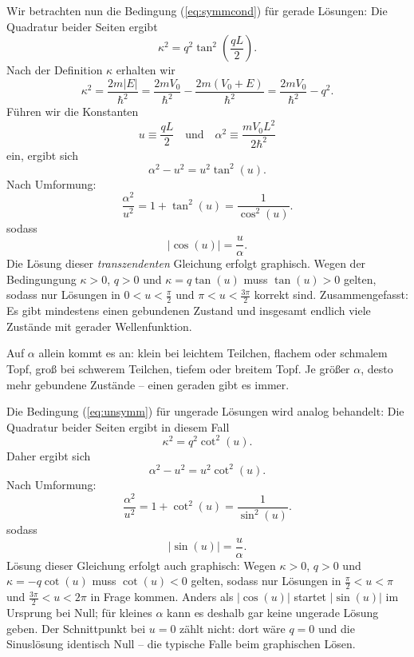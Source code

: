 Wir betrachten nun die Bedingung (\ref{eq:symmcond}) für gerade Lösungen: Die Quadratur beider Seiten ergibt
\begin{equation}
	\kappa^2 = q^2\tan^2\left(\frac{qL}{2}\right).
\end{equation}
Nach der Definition $\kappa$ erhalten wir
\begin{equation}
	\kappa^2 = \frac{2m|E|}{\hbar^2} = \frac{2mV_0}{\hbar^2} - \frac{2m(V_0+E)}{\hbar^2} = \frac{2mV_0}{\hbar^2} - q^2.
\end{equation}
Führen wir die Konstanten
\begin{equation}
	u\equiv \frac{qL}{2}\quad \text{und}\quad \alpha^2 \equiv \frac{m V_0 L^2}{2\hbar^2}
\end{equation}
ein, ergibt sich
\begin{equation}
	\alpha^2-u^2 = u^2\tan^2(u).
\end{equation}
Nach Umformung:
\begin{equation}
	\frac{\alpha^2}{u^2} = 1+\tan^2(u) = \frac{1}{\cos^2(u)}.
\end{equation}
sodass
\begin{equation}
	|\cos(u)| = \frac{u}{\alpha}.
\end{equation}
Die Lösung dieser \emph{transzendenten} Gleichung erfolgt graphisch. Wegen der Bedingungung $\kappa>0$, $q>0$ und $\kappa = q\tan(u)$ muss $\tan(u)>0$ gelten, sodass nur Lösungen in $0<u<\frac{\pi}{2}$ und $\pi < u < \frac{3\pi}{2}$ korrekt sind. Zusammengefasst: Es gibt mindestens einen gebundenen Zustand und insgesamt endlich viele Zustände mit gerader Wellenfunktion.

\begin{merksatz}
	Auf $\alpha$ allein kommt es an: klein bei leichtem Teilchen, flachem oder schmalem Topf, groß bei schwerem Teilchen, tiefem oder breitem Topf. Je größer $\alpha$, desto mehr gebundene Zustände -- einen geraden gibt es immer.
\end{merksatz}


Die Bedingung (\ref{eq:unsymm}) für ungerade Lösungen wird analog behandelt: Die Quadratur beider Seiten ergibt in diesem Fall
\begin{equation}
	\kappa^2 = q^2\cot^2\left(u\right).
\end{equation}
Daher ergibt sich
\begin{equation}
	\alpha^2-u^2 = u^2\cot^2(u).
\end{equation}
Nach Umformung:
\begin{equation}
	\frac{\alpha^2}{u^2} = 1+\cot^2(u) = \frac{1}{\sin^2(u)}.
\end{equation}
sodass
\begin{equation}
	|\sin(u)| = \frac{u}{\alpha}.
\end{equation}
Lösung dieser Gleichung erfolgt auch graphisch: Wegen $\kappa>0$, $q>0$ und $\kappa = -q\cot(u)$ muss $\cot(u)<0$ gelten, sodass nur Lösungen in $\frac{\pi}{2}<u< \pi$ und $\frac{3\pi}{2} < u < 2\pi$ in Frage kommen. Anders als $|\cos(u)|$ startet $|\sin(u)|$ im Ursprung bei Null; für kleines $\alpha$ kann es deshalb gar keine ungerade Lösung geben. Der Schnittpunkt bei $u=0$ zählt nicht: dort wäre $q=0$ und die Sinuslösung identisch Null -- die typische Falle beim graphischen Lösen.

